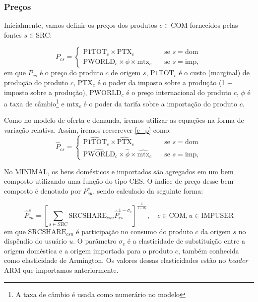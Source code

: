 \documentclass[12pt,twoside]{article}
\let\rmarkdownfootnote\footnote%
\def\footnote{\protect\rmarkdownfootnote}
\begin{document}
\hypertarget{preuxe7os}{%
\subsubsection{Preços}\label{preuxe7os}}

Inicialmente, vamos definir os preços dos produtos \(c \in \text{COM}\)
fornecidos pelas fontes \(s \in \text{SRC}\):

\begin{equation}\label{e_p}
P_{cs} =
\begin{cases}
\text{P1TOT}_c \times \text{PTX}_{c}       & \quad \text{se } s = \text{dom}\\
\text{PWORLD}_c \times \phi \times \text{mtx}_c       & \quad \text{se } s = \text{imp},
\end{cases}
\end{equation} em que \(P_{cs}\) é o preço do produto \(c\) de origem
\(s\), \(\text{P1TOT}_{c}\) é o custo (marginal) de produção do produto
\(c\), \(\text{PTX}_{c}\) é o poder da imposto sobre a produção (1 +
imposto sobre a produção), \(\text{PWORLD}_c\) é o preço internacional
do produto \(c\), \(\phi\) é a taxa de câmbio\footnote{A taxa de câmbio
  é usada como numerário no modelo} e \(\text{mtx}_c\) é o poder da
tarifa sobre a importação do produto \(c\).

Como no modelo de oferta e demanda, iremos utilizar as equações na forma
de variação relativa. Assim, iremos reescrever \ref{e_p} como:
\begin{equation}\label{e_p_hat}
\hat{P}_{cs} =
\begin{cases}
\hat{\text{P1TOT}}_c \times \hat{\text{PTX}}_{c}       & \quad \text{se } s = \text{dom}\\
\hat{\text{PWORLD}}_c \times \hat{\phi} \times \hat{\text{mtx}}_c       & \quad \text{se } s = \text{imp},
\end{cases}
\end{equation}

No MINIMAL, os bens domésticos e importados são agregados em um bem
composto utilizando uma função do tipo CES. O índice de preço desse bem
composto é denotado por \(P^s_{cu}\), sendo calculado da seguinte forma:

\[\hat{P}^s_{cu} = \left[\sum_{s\in SRC}\text{SRCSHARE}_{csu} \hat{P}_{cs}^{1 - \sigma_c}\right]^\frac{1}{1 - \sigma_c}, \quad c \in \text{COM}, u \in \text{IMPUSER}\]
em que \(\text{SRCSHARE}_{csu}\) é participação no consumo do produto
\(c\) da origem \(s\) no dispêndio do usuário \(u\). O parâmetro
\(\sigma_c\) é a elasticidade de substituição entre a origem doméstica e
a origem importada para o produto \(c\), também conhecida como
elasticidade de Armington. Os valores dessas elasticidades estão no
\emph{header} ARM que importamos anteriormente.
\end{document}
